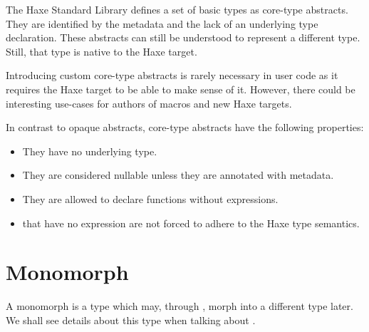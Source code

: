 The Haxe Standard Library defines a set of basic types as core-type abstracts. They are identified by the  metadata and the lack of an underlying type declaration. These abstracts can still be understood to represent a different type. Still, that type is native to the Haxe target. 

Introducing custom core-type abstracts is rarely necessary in user code as it requires the Haxe target to be able to make sense of it. However, there could be interesting use-cases for authors of macros and new Haxe targets.

In contrast to opaque abstracts, core-type abstracts have the following properties:

\begin{itemize}
	\item They have no underlying type.
	\item They are considered nullable unless they are annotated with  metadata.
	\item They are allowed to declare  functions without expressions.
	\item {} that have no expression are not forced to adhere to the Haxe type semantics.
\end{itemize}



\section{Monomorph}
\label{types-monomorph}

A monomorph is a type which may, through , morph into a different type later. We shall see details about this type when talking about .
